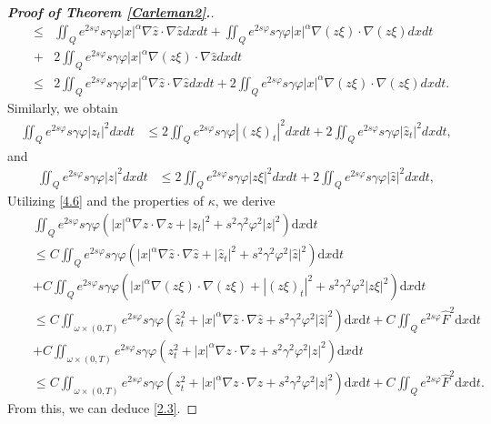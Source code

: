 \documentclass[10pt,a4paper]{amsart}
\def\al{\alpha}
\def\bf{\textbf}
\def\df{\mathrm d}
\def\ga{\gamma}
\def\om{\omega}
\def\ts{\times}
\def\vp{\varphi}
\begin{document}
\begin{proof}[{\rm \bf { Proof of  Theorem \ref{Carleman2}.}}]
\begin{eqnarray*}
				&\le& \iint_Qe^{2s\vp}s\ga \vp |x|^\al \nabla \hat{z}\cdot \nabla \hat{z} dx dt + \iint_Qe^{2s\vp}s\ga \vp |x|^\al \nabla \left(z\xi \right) \cdot \nabla \left(z\xi \right) dx dt\\
				&+& 2 \iint_Qe^{2s\vp}s\ga \vp |x|^\al \nabla \left(z\xi \right) \cdot \nabla \hat{z} dx dt\\
				&\le& 2\iint_Qe^{2s\vp}s\ga \vp |x|^\al \nabla \hat{z}\cdot \nabla \hat{z} dx dt + 2\iint_Qe^{2s\vp}s\ga \vp |x|^\al \nabla \left(z\xi \right) \cdot \nabla \left(z\xi \right) dx dt.
			\end{eqnarray*}
			Similarly, we obtain
			\begin{equation*}
				\begin{split}
					\iint_Qe^{2s\vp}s\ga \vp |z_t|^2 dx dt
					&\le 2\iint_Qe^{2s\vp}s\ga \vp |(z \xi)_t | ^2 dx dt + 2\iint_Qe^{2s\vp}s\ga \vp |\hat{z}_t|^2  dx dt,
				\end{split}
			\end{equation*}
			and
			\begin{equation*}
				\begin{split}
					\iint_Qe^{2s\vp}s\ga \vp |z|^2 dx dt
					&\le 2\iint_Qe^{2s\vp}s\ga \vp |z\xi|^2 dx dt + 2\iint_Qe^{2s\vp}s\ga \vp |\hat{z}| ^2 dx dt,
				\end{split}
			\end{equation*}
			Utilizing \eqref{4.6} and the properties of  $\kappa$, we derive
			\begin{eqnarray*}
				&&\iint_Qe^{2s\vp}s\ga \vp \left(|x|^\al \nabla z\cdot \nabla z+|z_t|^2+s^2\ga^2\vp^2|z|^2\right)\df x\df t\\
				&&\le C\iint_Qe^{2s\vp}s\ga \vp \left(|x|^\al \nabla \hat{z}\cdot \nabla \hat{z}+|\hat{z}_t|^2+s^2\ga^2\vp^2|\hat{z}|^2\right)\df x\df t\\
				&&+
				C\iint_Qe^{2s\vp}s\ga \vp \left(|x|^\al \nabla (z \xi)\cdot \nabla (z \xi)+|(z \xi)_t|^2+s^2\ga^2\vp^2|z \xi|^2\right)\df x\df t\\
				&&\le
				C\iint_{\om\ts (0,T)}e^{2s\vp}s\ga \vp\left( \hat{z}_t^2+|x|^\al \nabla \hat{z}\cdot \nabla \hat{z} +s^2\ga^2\vp^2|\hat{z}|^2 \right)\df x\df t+C\iint_Qe^{2s\vp} \hat{F}^2\df x\df t\\
				&&+C\iint_{\om\ts (0,T)}e^{2s\vp}s\ga \vp\left( z_t^2+|x|^\al \nabla z\cdot \nabla z +s^2\ga^2\vp^2|z|^2 \right)\df x\df t\\
				&&\le C\iint_{\om\ts (0,T)}e^{2s\vp}s\ga \vp\left( z_t^2+|x|^\al \nabla z\cdot \nabla z +s^2\ga^2\vp^2|z|^2 \right)\df x\df t +C\iint_Qe^{2s\vp} \hat{F}^2\df x\df t.
			\end{eqnarray*}
			From this, we can deduce \eqref{2.3}. 		
		\end{proof}
\end{document}
